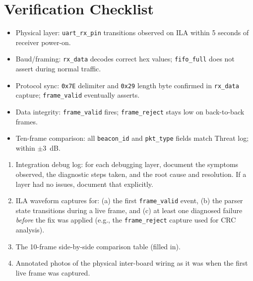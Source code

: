 \documentclass[11pt,letterpaper]{article}
\begin{document}
\section{Verification Checklist}
\begin{itemize}[leftmargin=2em]
	\item[$\square$] Physical layer: \texttt{uart\_rx\_pin} transitions observed on \mbox{ILA} within 5 seconds of receiver power-on.
	\item[$\square$] Baud/framing: \texttt{rx\_data} decodes correct hex values; \texttt{fifo\_full} does not assert during normal traffic.
	\item[$\square$] Protocol sync: \texttt{0x7E} delimiter and \texttt{0x29} length byte confirmed in \texttt{rx\_data} capture; \texttt{frame\_valid} eventually asserts.
	\item[$\square$] Data integrity: \texttt{frame\_valid} fires; \texttt{frame\_reject} stays low on back-to-back frames.
	\item[$\square$] Ten-frame comparison: all \texttt{beacon\_id} and \texttt{pkt\_type} fields match Threat log; \RSSI{} within $\pm$3~dB.
\end{itemize}

\begin{tcolorbox}[deliverable={Lab Handout 3-C Deliverable --- Module 3 Integration Milestone}]
	\begin{enumerate}[leftmargin=1.2em]
		\item Integration debug log: for each debugging layer, document the symptoms observed, the diagnostic steps taken, and the root cause and resolution. If a layer had no issues, document that explicitly.
		\item \mbox{ILA} waveform captures for: (a) the first \texttt{frame\_valid} event, (b) the parser state transitions during a live frame, and (c) at least one diagnosed failure \emph{before} the fix was applied (e.g., the \texttt{frame\_reject} capture used for \mbox{CRC} analysis).
		\item The 10-frame side-by-side comparison table (filled in).
		\item Annotated photos of the physical inter-board wiring as it was when the first live frame was captured.
	\end{enumerate}
\end{tcolorbox}

\printhandoutglossary
\end{document}
